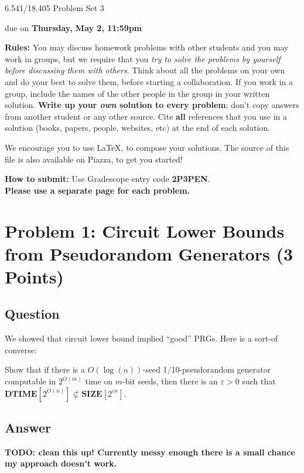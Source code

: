 \documentclass{article}
\newcommand{\DTIME}{\mathbf{DTIME}}
\newcommand{\SIZE}{\mathbf{SIZE}}
\def \eps {{\varepsilon}}
\begin{document}
	
	
	\begin{center}
		\Large
		6.541/18.405 Problem Set 3
		
		\vspace{3pt}
		\normalsize
		due on {\bf Thursday, May 2, 11:59pm}
	\end{center}
	
	{\bf Rules:} You may discuss homework problems with other students and you may work in groups, but we require that you {\em try to solve the problems by yourself before discussing them with others}. Think about all the problems on your own and do your best to solve them, before starting a collaboration. If you work in a group, include the names of the other people in the group in your written solution. {\bf Write up your {\em own} solution to every problem}; don't copy answers from another student or any other source. Cite {\bf all} references that you use in a solution (books, papers, people, websites, etc) at the end of each solution. 
	
	We encourage you to use \LaTeX, to compose your solutions. The source of this file is also available on Piazza, to get you started!
	
	{\bf How to submit:} Use Gradescope entry code \textbf{2P3PEN}.\\ \textbf{\large Please use a separate page for each problem.} 

\section*{Problem 1: Circuit Lower Bounds from Pseudorandom Generators (3 Points)}

\subsection*{Question}
We showed that circuit lower bound implied ``good'' PRGs. Here is a sort-of converse:

Show that if there is a $O(\log(n))$-seed 1/10-pseudorandom generator computable in $2^{O(m)}$ time on $m$-bit seeds, then there is an $\eps>0$ such that $\DTIME[2^{O(n)}]\not\subset\SIZE[2^{\eps n}]$.

\subsection*{Answer}
\textbf{TODO: clean this up!  Currently messy enough there is a small chance my approach doesn't work.}
\end{document}
